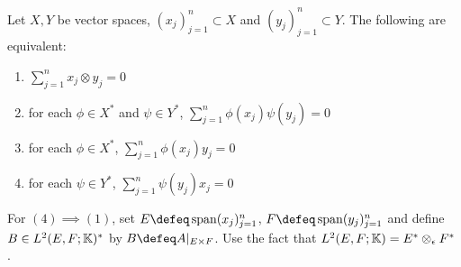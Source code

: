 \documentclass{book}
\begin{document}
\begin{ex}
	Let $X,Y$ be vector spaces, $(x_j)_{j=1}^n \subset X$ and $(y_j)_{j=1}^n \subset Y$. The following are equivalent:
	\begin{enumerate}
		\item $\sum\limits_{j=1}^n  x_j \otimes y_j = 0$
		\item for each $\phi \in X^*$ and $\psi \in Y^*$, $\sum\limits_{j=1}^n  \phi(x_j) \psi(y_j) = 0$
		\item for each $\phi \in X^*$, $\sum\limits_{j=1}^n  \phi(x_j)  y_j = 0$
		\item for each $\psi \in Y^*$, $\sum\limits_{j=1}^n  \psi(y_j) x_j = 0$
	\end{enumerate}
	 For $(4) \implies (1)$, set $E \defeq \spn (x_j)_{j=1}^n$, $F \defeq \spn(y_j)_{j=1}^n$ and define $B \in L^2(E,F;\mathbb{K})^*$ by $B \defeq A|_{E \times F}$. Use the fact that $L^2(E, F; \mathbb{K}) = E^* \otimes_{\epsilon} F^*$ .
\end{ex}
\end{document}
